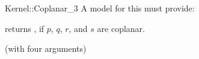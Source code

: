 \begin{ccRefFunctionObjectConcept}{Kernel::Coplanar_3}
A model for this must provide:


{returns , if $p$, $q$, $r$, and $s$ are coplanar.}

\ccRefines
{} (with four arguments)

\ccSeeAlso
{}\\

\end{ccRefFunctionObjectConcept}
